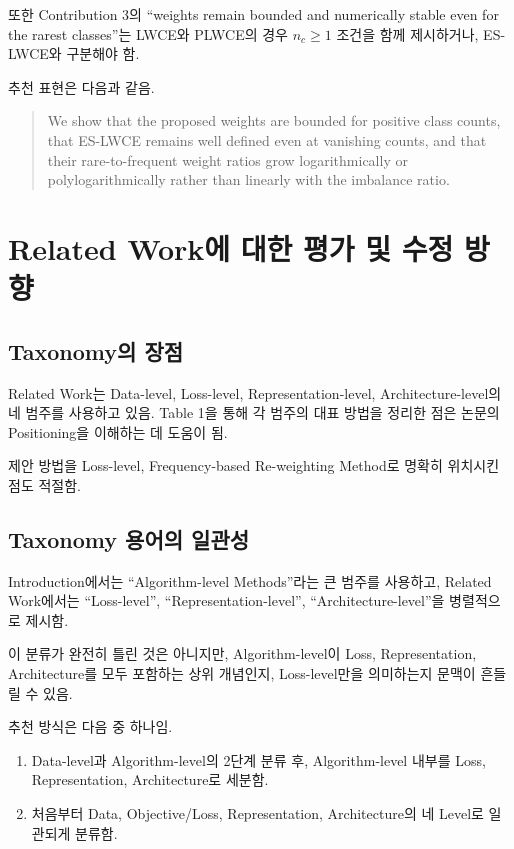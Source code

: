 \documentclass[11pt,a4paper]{article}
\begin{document}
또한 Contribution 3의 ``weights remain bounded and numerically stable even for the rarest classes''는 LWCE와 PLWCE의 경우 \(n_c\geq1\) 조건을 함께 제시하거나, ES-LWCE와 구분해야 함.

추천 표현은 다음과 같음.

\begin{quote}
We show that the proposed weights are bounded for positive class counts, that ES-LWCE remains well defined even at vanishing counts, and that their rare-to-frequent weight ratios grow logarithmically or polylogarithmically rather than linearly with the imbalance ratio.
\end{quote}

\section{Related Work에 대한 평가 및 수정 방향}

\subsection{Taxonomy의 장점}

Related Work는 Data-level, Loss-level, Representation-level, Architecture-level의 네 범주를 사용하고 있음. Table 1을 통해 각 범주의 대표 방법을 정리한 점은 논문의 Positioning을 이해하는 데 도움이 됨.

제안 방법을 Loss-level, Frequency-based Re-weighting Method로 명확히 위치시킨 점도 적절함.

\subsection{Taxonomy 용어의 일관성}

Introduction에서는 ``Algorithm-level Methods''라는 큰 범주를 사용하고, Related Work에서는 ``Loss-level'', ``Representation-level'', ``Architecture-level''을 병렬적으로 제시함.

이 분류가 완전히 틀린 것은 아니지만, Algorithm-level이 Loss, Representation, Architecture를 모두 포함하는 상위 개념인지, Loss-level만을 의미하는지 문맥이 흔들릴 수 있음.

추천 방식은 다음 중 하나임.

\begin{enumerate}
\item Data-level과 Algorithm-level의 2단계 분류 후, Algorithm-level 내부를 Loss, Representation, Architecture로 세분함.
\item 처음부터 Data, Objective/Loss, Representation, Architecture의 네 Level로 일관되게 분류함.
\end{enumerate}
\end{document}
